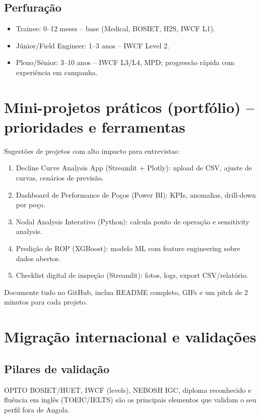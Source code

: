 \documentclass[11pt,openany]{book}
\begin{document}
\subsection{Perfura\c{c}\~ao}
\begin{itemize}
  \item Trainee: 0--12 meses -- base (Medical, BOSIET, H2S, IWCF L1).
  \item J\'unior/Field Engineer: 1--3 anos -- IWCF Level 2.
  \item Pleno/S\'enior: 3--10 anos -- IWCF L3/L4, MPD; progress\~ao r\'apida com experi\^encia em campanha.
\end{itemize}

\section{Mini-projetos pr\'aticos (portf\'olio) -- prioridades e ferramentas}
Sugest\~oes de projetos com alto impacto para entrevistas:
\begin{enumerate}
  \item Decline Curve Analysis App (Streamlit + Plotly): upload de CSV, ajuste de curvas, cen\'arios de previs\~ao.
  \item Dashboard de Performance de Po\c{c}os (Power BI): KPIs, anomalias, drill-down por po\c{c}o.
  \item Nodal Analysis Interativo (Python): calcula ponto de opera\c{c}\~ao e sensitivity analysis.
  \item Predi\c{c}\~ao de ROP (XGBoost): modelo ML com feature engineering sobre dados abertos.
  \item Checklist digital de inspe\c{c}\~ao (Streamlit): fotos, logs, export CSV/relat\'orio.
\end{enumerate}

Documente tudo no GitHub, inclua README completo, GIFs e um pitch de 2 minutos para cada projeto.

\section{Migra\c{c}\~ao internacional e valida\c{c}\~oes}
\subsection{Pilares de valida\c{c}\~ao}
OPITO BOSIET/HUET, IWCF (levels), NEBOSH IGC, diploma reconhecido e flu\^encia em ingl\^es (TOEIC/IELTS) s\~ao os principais elementos que validam o seu perfil fora de Angola.
\end{document}
